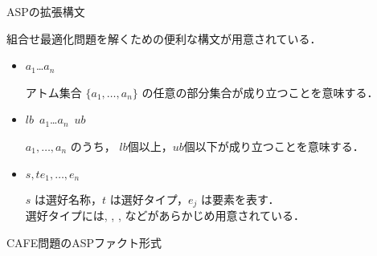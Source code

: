 \documentclass[dvipdfmx, 11pt]{beamer}
\begin{document}
\begin{frame}{ASPの拡張構文}
  \begin{alertblock}{}\centering
    組合せ最適化問題を解くための便利な構文が用意されている．
  \end{alertblock}

  \begin{itemize}
 \item {}
   \begin{center}
     \code{\{}$a_1$\code{;}\ldots\code{;}$a_n$\code{\}}
   \end{center}
   アトム集合 $\{a_1,\dots,a_n\}$
   の任意の部分集合が成り立つことを意味する．
 \item {}
   \begin{center}
     $lb$\ \code{\{}$a_1$\code{;}\ldots\code{;}$a_n$\code{\}}\ $ub$
   \end{center}
   $a_1,\dots,a_n$ のうち，
   $lb$個以上，$ub$個以下が成り立つことを意味する．
 \item {}
       \begin{center}
	$s,t$\code{)\{}$e_1,\dots,e_n$
       \end{center}
       $s$ は選好名称，$t$ は選好タイプ，$e_j$ は要素を表す．\\
       選好タイプには, , , 
       などがあらかじめ用意されている．
 \end{itemize}
\end{frame}
\begin{frame}{CAFE問題のASPファクト形式}
  \begin{multicols}{2}
    \scriptsize
    
  \end{multicols}
\end{frame}
\end{document}
